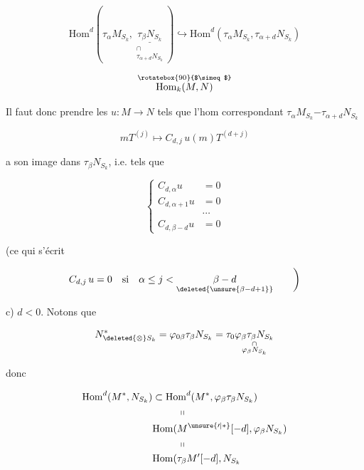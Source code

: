 
\[
\mathrm{Hom}^{d}(\tau_\alpha M_{S_k},\underset{\substack{\cap\\\tau_{\alpha+d}N_{S_k}}}{\underline{\tau_\beta N_{S_k}}})
\hookrightarrow\mathrm{Hom}^{d}(\tau_\alpha M_{S_k},\tau_{\alpha+d}N_{S_k})
\]


\[
\overset{\rotatebox{90}{$\simeq$}}{\mathrm{Hom}_k(M,N)}
\]

Il faut donc prendre les $u:M\longrightarrow N$ tels que l'hom correspondant $\tau_\alpha M_{S_k}\mathord{-}\tau_{\alpha+d}N_{S_k}$

\[
mT^{(j)}\longmapsto C_{d,j}\,u(m)T^{(d+j)}
\]

 a son image dans $\tau_\beta N_{S_k}$, i.e. tels que

\[
\left\{\begin{aligned}
C_{d,\alpha}u&=0\\
C_{d,\alpha+1}u&=0\\
&\cdots\\
C_{d,\beta-d}u&=0
\end{aligned}\right.
\]

(ce qui s'écrit

\[
C_{d,j}\,u=0\quad\text{si}\quad\alpha\leq j<\underset{\deleted{\unsure{\beta-d+1}}}{\beta-d}\qquad\bigg)
\]

c) \uline{$d<0$}. Notons que

\[
N^{*}_{\deleted{\otimes}S_k}=\varphi_{0\beta}\tau_\beta N_{S_k}=\tau_0\underset{\substack{\cap\\\varphi_\beta N_{S_k}}}{\varphi_\beta\tau_\beta N_{S_k}}
\]

donc 

\[
\begin{aligned}
\mathrm{Hom}^{d}(M^{*},N_{S_k})&\subset\mathrm{Hom}^{d}(M^{*},\varphi_\beta\tau_\beta N_{S_k})\\
&\hspace{9mm}\shortparallel\\
&\mathrm{Hom}(M^{\unsure{\prime|*}}[-d],\varphi_\beta N_{S_k})\\
&\hspace{9mm}\shortparallel\\
&\mathrm{Hom}(\tau_\beta M^{\prime}[-d],N_{S_k}
\end{aligned}
\]

